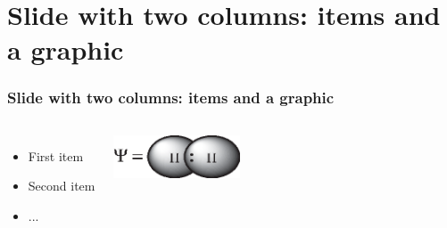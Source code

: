 \documentclass[]{beamer}
\begin{document}
\section{Slide with two columns: items and a graphic}
\begin{frame}
  \frametitle{Slide with two columns: items and a graphic}   %
  \begin{columns}[c]
  \column{2in}  %
  \begin{itemize}
  \item<1-> First item
  \item<2-> Second item
  \item<3-> ...
  \end{itemize}
  \column{2in}
  \includegraphics[height=0.5in]{../figures/coulson.eps}
  \end{columns}
\end{frame}
\end{document}
